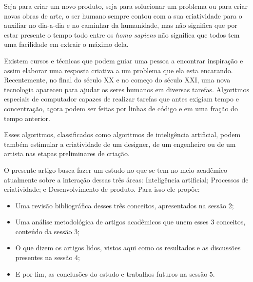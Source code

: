 Seja para criar um novo produto, seja para solucionar um problema ou para criar novas obras de arte, o ser humano sempre contou com a sua criatividade para o auxiliar no dia-a-dia e no caminhar da humanidade, mas não significa que por estar presente o tempo todo entre os \textit{homo sapiens} não significa que todos tem uma facilidade em extrair o máximo dela. 

Existem cursos e técnicas que podem guiar uma pessoa a encontrar inspiração e assim elaborar uma resposta criativa a um problema que ela esta encarando. Recentemente, no final do século XX e no começo do século XXI, uma nova tecnologia apareceu para ajudar os seres humanos em diversas tarefas. Algoritmos especiais de computador capazes de realizar tarefas que antes exigiam tempo e concentração, agora podem ser feitas por linhas de código e em uma fração do tempo anterior. 

Esses algoritmos, classificados como algoritmos de inteligência artificial, podem também estimular a criatividade de um designer, de um engenheiro ou de um artista nas etapas preliminares de criação.

O presente artigo busca fazer um estudo no que se tem no meio acadêmico atualmente sobre a interação dessas três áreas: Inteligência artificial; Processos de criatividade; e Desenvolvimento de produto. Para isso ele propõe:

\begin{itemize}
    \item Uma revisão bibliográfica desses três conceitos, apresentados na sessão 2;
    \item Uma análise metodológica de artigos acadêmicos que unem esses 3 conceitos, conteúdo da sessão 3;
    \item O que dizem os artigos lidos, vistos aqui como os resultados e as discussões presentes na sessão 4;
    \item E por fim, as conclusões do estudo e trabalhos futuros na sessão 5.
\end{itemize}